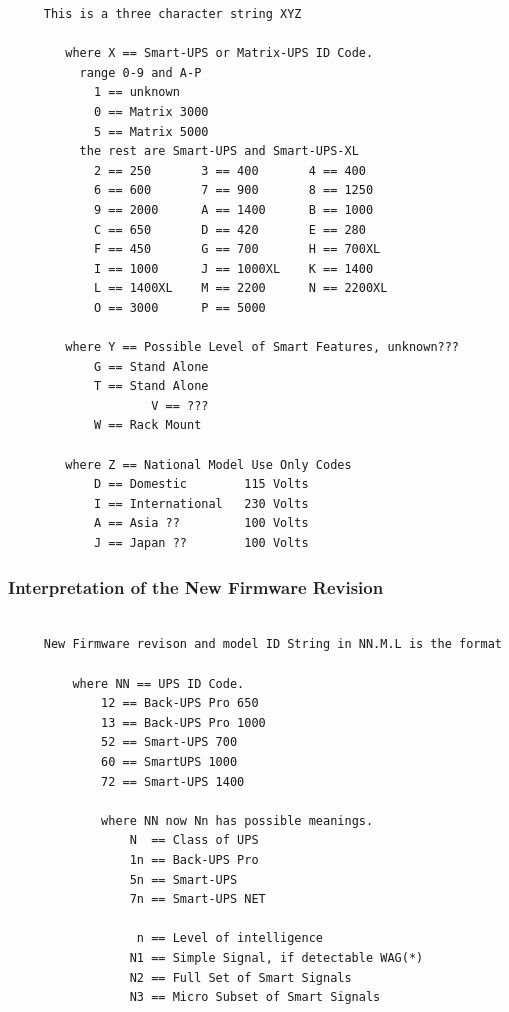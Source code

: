 {{{{{{{{{{{{{{{{{\begin{verbatim}
     This is a three character string XYZ
     
        where X == Smart-UPS or Matrix-UPS ID Code.
          range 0-9 and A-P
            1 == unknown
            0 == Matrix 3000
            5 == Matrix 5000
          the rest are Smart-UPS and Smart-UPS-XL
            2 == 250       3 == 400       4 == 400
            6 == 600       7 == 900       8 == 1250
            9 == 2000      A == 1400      B == 1000
            C == 650       D == 420       E == 280
            F == 450       G == 700       H == 700XL
            I == 1000      J == 1000XL    K == 1400
            L == 1400XL    M == 2200      N == 2200XL
            O == 3000      P == 5000
     
        where Y == Possible Level of Smart Features, unknown???
            G == Stand Alone
            T == Stand Alone
                    V == ???
            W == Rack Mount
     
        where Z == National Model Use Only Codes
            D == Domestic        115 Volts
            I == International   230 Volts
            A == Asia ??         100 Volts
            J == Japan ??        100 Volts
\end{verbatim}
\normalsize

\label{Interpretation-of-the-New-Firmware-Revision}

\subsubsection*{Interpretation of the New Firmware Revision}

\footnotesize
\begin{verbatim}
     
     New Firmware revison and model ID String in NN.M.L is the format
     
         where NN == UPS ID Code.
             12 == Back-UPS Pro 650
             13 == Back-UPS Pro 1000
             52 == Smart-UPS 700
             60 == SmartUPS 1000
             72 == Smart-UPS 1400
     
             where NN now Nn has possible meanings.
                 N  == Class of UPS
                 1n == Back-UPS Pro
                 5n == Smart-UPS
                 7n == Smart-UPS NET
     
                  n == Level of intelligence
                 N1 == Simple Signal, if detectable WAG(*)
                 N2 == Full Set of Smart Signals
                 N3 == Micro Subset of Smart Signals
     

\end{verbatim}}}}}}}}}}}}}}}}}}
